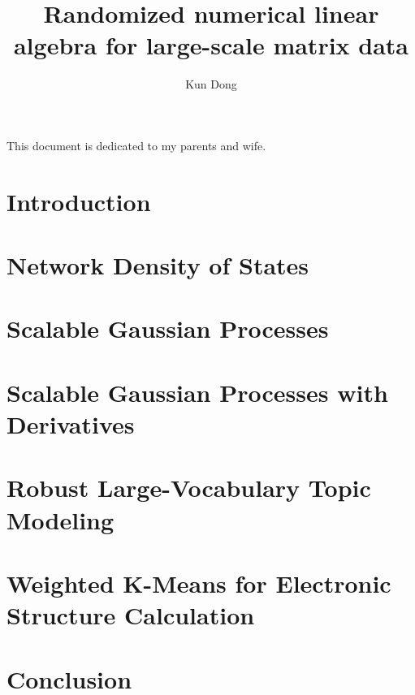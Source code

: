 \documentclass[phd,tocprelim]{cornell}
\title {Randomized numerical linear algebra for large-scale matrix data}
\author {Kun Dong}
\begin{document}
\maketitle
\makecopyright

\begin{abstract}
	
\end{abstract}

\begin{biosketch}
  
\end{biosketch}

\begin{dedication}
This document is dedicated to my parents and wife.
\end{dedication}

\begin{acknowledgements}
	
\end{acknowledgements}

\contentspage
\tablelistpage
\figurelistpage

\normalspacing \setcounter{page}{1} 
\pagestyle{cornell} \addtolength{\parskip}{0.5\baselineskip}

\chapter{Introduction}
	\label{ch1}
	

\chapter{Network Density of States}
	\label{ch2}
	

\chapter{Scalable Gaussian Processes}
	\label{ch3}
	

\chapter{Scalable Gaussian Processes with Derivatives}
	\label{ch4}
	

\chapter{Robust Large-Vocabulary Topic Modeling}
	\label{ch5}
	

\chapter{Weighted K-Means for Electronic Structure Calculation}
	\label{ch6}
	

\chapter{Conclusion}
	\label{ch7}
	




\end{document}
